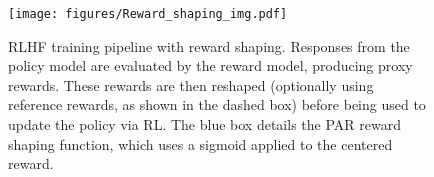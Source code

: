 \begin{figure}[htbp]
\texttt{[image: figures/Reward\_shaping\_img.pdf]}
\caption{RLHF training pipeline with reward shaping.  Responses from the policy model are evaluated by the reward model, producing proxy rewards.  These rewards are then reshaped (optionally using reference rewards, as shown in the dashed box) before being used to update the policy via RL.  The blue box details the PAR reward shaping function, which uses a sigmoid applied to the centered reward.}
\label{fig:reward_shaping}
\end{figure}